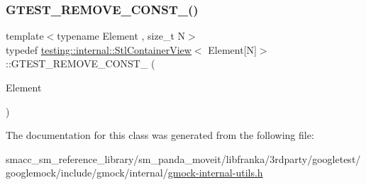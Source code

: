 \subsubsection{\texorpdfstring{G\+T\+E\+S\+T\+\_\+\+R\+E\+M\+O\+V\+E\+\_\+\+C\+O\+N\+S\+T\+\_\+()}{GTEST\_REMOVE\_CONST\_()}}
{\footnotesize\ttfamily template$<$typename Element , size\+\_\+t N$>$ \\
typedef \hyperlink{classtesting_1_1internal_1_1StlContainerView}{testing\+::internal\+::\+Stl\+Container\+View}$<$ Element\mbox{[}N\mbox{]}$>$\+::G\+T\+E\+S\+T\+\_\+\+R\+E\+M\+O\+V\+E\+\_\+\+C\+O\+N\+S\+T\+\_\+ (\begin{DoxyParamCaption}\item[{Element}]{ }\end{DoxyParamCaption})}



The documentation for this class was generated from the following file\+:\begin{DoxyCompactItemize}
\item 
smacc\+\_\+sm\+\_\+reference\+\_\+library/sm\+\_\+panda\+\_\+moveit/libfranka/3rdparty/googletest/googlemock/include/gmock/internal/\hyperlink{gmock-internal-utils_8h}{gmock-\/internal-\/utils.\+h}\end{DoxyCompactItemize}

